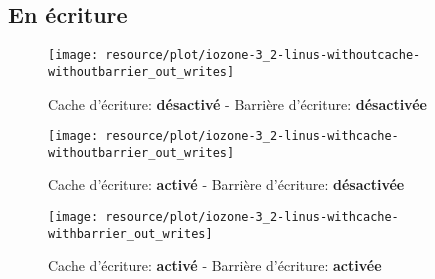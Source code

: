 \subsection*{En écriture}

\begin{figure}[H]
	\centering
	\texttt{[image: resource/plot/iozone-3\_2-linus-withoutcache-withoutbarrier\_out\_writes]}
	\caption{Cache d'écriture: \textbf{désactivé}   -   Barrière d'écriture: \textbf{désactivée}}
\end{figure}

\begin{figure}[H]
	\centering
	\texttt{[image: resource/plot/iozone-3\_2-linus-withcache-withoutbarrier\_out\_writes]}
	\caption{Cache d'écriture: \textbf{activé}   -   Barrière d'écriture: \textbf{désactivée}}
\end{figure}

\begin{figure}[H]
	\centering
	\texttt{[image: resource/plot/iozone-3\_2-linus-withcache-withbarrier\_out\_writes]}
	\caption{Cache d'écriture: \textbf{activé}   -   Barrière d'écriture: \textbf{activée}}
\end{figure}
